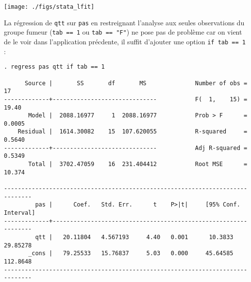 \texttt{[image: ./figs/stata\_lfit]}

La régression de \texttt{qtt} sur \texttt{pas} en restreignant l'analyse aux
seules observations du groupe fumeur (\verb|tab == 1| ou \verb|tab == "F"|) 
ne pose pas de problème car on vient de le voir dans l'application
précdente, il suffit d'ajouter une option \texttt{if tab == 1} :
\begin{verbatim}
. regress pas qtt if tab == 1

      Source |       SS       df       MS              Number of obs =      17
-------------+------------------------------           F(  1,    15) =   19.40
       Model |  2088.16977     1  2088.16977           Prob > F      =  0.0005
    Residual |  1614.30082    15  107.620055           R-squared     =  0.5640
-------------+------------------------------           Adj R-squared =  0.5349
       Total |  3702.47059    16  231.404412           Root MSE      =  10.374

------------------------------------------------------------------------------
         pas |      Coef.   Std. Err.      t    P>|t|     [95% Conf. Interval]
-------------+----------------------------------------------------------------
         qtt |   20.11804   4.567193     4.40   0.001      10.3833    29.85278
       _cons |   79.25533   15.76837     5.03   0.000     45.64585    112.8648
------------------------------------------------------------------------------
\end{verbatim}

